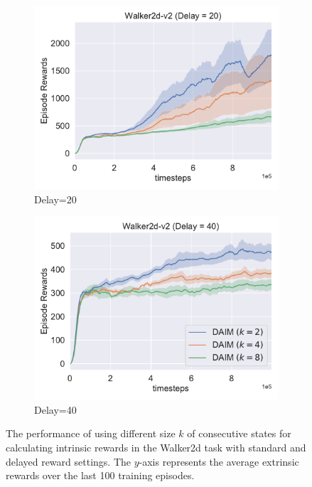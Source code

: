 \begin{figure}[h!]
\begin{subfigure}[t]{0.49\textwidth}
    \includegraphics[width=\textwidth]{figures/chapter5/multi_frames/delay20.pdf}
    \caption{Delay=20}
  \end{subfigure}\hfill
  \begin{subfigure}[t]{0.49\textwidth}
    \includegraphics[width=\textwidth]{figures/chapter5/multi_frames/delay40.pdf}
    \caption{Delay=40}
  \end{subfigure}\hfill
  \caption{The performance of using different size $k$ of consecutive states for calculating intrinsic rewards in the Walker2d task with standard and delayed reward settings.  The $y$-axis represents the average extrinsic rewards over the last 100 training episodes.} 
  \label{fig:multi_frames}
\end{figure}

